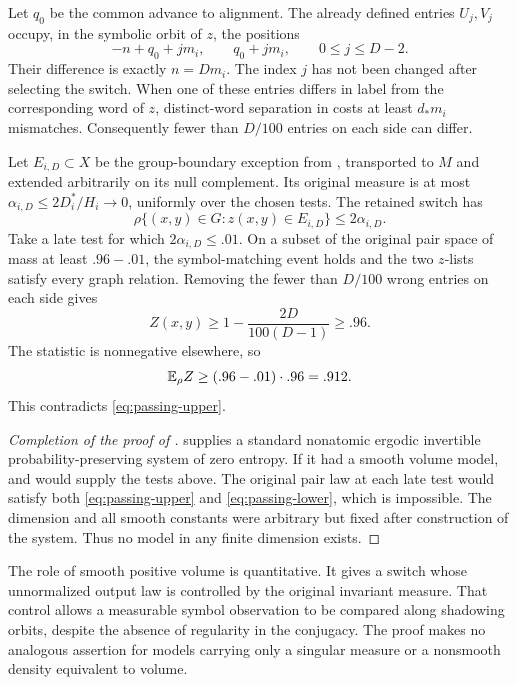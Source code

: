 Let $q_0$ be the common advance to alignment.
The already defined entries $U_j,V_j$ occupy, in the symbolic
orbit of $z$, the positions
\[
 -n+q_0+jm_i,\qquad q_0+jm_i,\qquad 0\le j\le D-2.
\]
Their difference is exactly $n=Dm_i$. The index $j$ has not
been changed after selecting the switch.
When one of these entries differs in label from the corresponding
word of $z$, distinct-word separation in
 costs at least $d_*m_i$ mismatches.
Consequently fewer than $D/100$ entries on each side can differ.

Let $E_{i,D}\subset X$ be the group-boundary exception from
, transported to $M$ and extended
arbitrarily on its null complement. Its original measure is at most
$\alpha_{i,D}\le2D_i^*/H_i\to0$, uniformly over the chosen
tests. The retained switch has
\[
 \rho\{(x,y)\in G:z(x,y)\in E_{i,D}\}
 \le2\alpha_{i,D}.
\]
Take a late test for which $2\alpha_{i,D}\le.01$.
On a subset of the original pair space of mass at least
$.96-.01$, the symbol-matching event holds and the two
$z$-lists satisfy every graph relation. Removing the fewer
than $D/100$ wrong entries on each side gives
\[
 Z(x,y)\ge 1-\frac{2D}{100(D-1)}\ge.96.
\]
The statistic is nonnegative elsewhere, so
\begin{equation}\label{eq:passing-lower}
 \mathbb E_\rho Z\ge(.96-.01)\cdot.96=.912.
\end{equation}
This contradicts \eqref{eq:passing-upper}.

\begin{proof}[Completion of the proof of ]
 supplies a standard nonatomic ergodic
invertible probability-preserving system of zero entropy.
If it had a smooth volume model,  and
 would supply the tests above.
The original pair law at each late test would satisfy both
\eqref{eq:passing-upper} and \eqref{eq:passing-lower}, which is
impossible. The dimension and all smooth constants were arbitrary
but fixed after construction of the system. Thus no model in
any finite dimension exists.
\end{proof}

\begin{remark}
The role of smooth positive volume is quantitative.
It gives a switch whose unnormalized output law is controlled
by the original invariant measure. That control allows a
measurable symbol observation to be compared along shadowing
orbits, despite the absence of regularity in the conjugacy.
The proof makes no analogous assertion for models carrying
only a singular measure or a nonsmooth density equivalent
to volume.
\end{remark}
